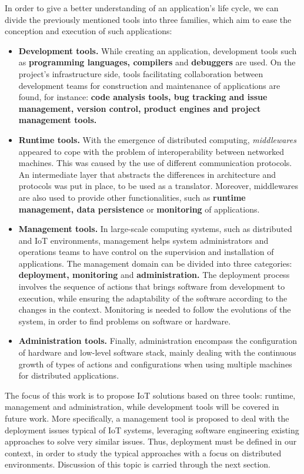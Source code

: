 In order to give a better understanding of an application's life cycle, we can divide the previously mentioned tools into three families, which aim to ease the conception and execution of such applications:
\begin{itemize}
	\item \textbf{Development tools.} While creating an application, development tools such as \textbf{programming languages, compilers} and \textbf{debuggers} are used. 
	On the project's infrastructure side, tools facilitating collaboration between development teams for construction and maintenance of applications are found, for instance: \textbf{code analysis tools, bug tracking and issue management, version control, product engines and project management tools.}
	\item \textbf{Runtime tools.} With the emergence of distributed computing, \textit{middlewares} appeared to cope with the problem of interoperability between networked machines.
	This was caused by the use of different communication protocols.
	An intermediate layer that abstracts the differences in architecture and protocols was put in place, to be used as a translator.
	Moreover, middlewares are also used to provide other functionalities, such as \textbf{runtime management, data persistence} or \textbf{monitoring} of applications.
	\item \textbf{Management tools.} In large-scale computing systems, such as distributed and IoT environments, management helps system administrators and operations teams to have control on the supervision and installation of applications.
	The management domain can be divided into three categories: \textbf{deployment, monitoring} and \textbf{administration.}
	The deployment process involves the sequence of actions that brings software from development to execution, while ensuring the adaptability of the software according to the changes in the context.
	Monitoring is needed to follow the evolutions of the system, in order to find problems on software or hardware.
	\item \textbf{Administration tools.} Finally, administration encompass the configuration of hardware and low-level software stack, mainly dealing with the continuous growth of types of actions and configurations when using multiple machines for distributed applications.
\end{itemize}

The focus of this work is to propose IoT solutions based on three tools: runtime, management and administration, while development tools will be covered in future work.
More specifically, a management tool is proposed to deal with the deployment issues typical of IoT systems, leveraging software engineering existing approaches to solve very similar issues.
Thus, deployment must be defined in our context, in order to study the typical approaches with a focus on distributed environments.
Discussion of this topic is carried through the next section.

